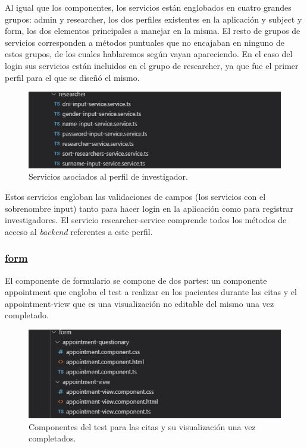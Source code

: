     Al igual que los componentes, los servicios están englobados en cuatro grandes grupos: admin y researcher, los dos perfiles existentes en la aplicación y subject y form, los dos elementos principales a manejar en la misma. El resto de grupos de servicios corresponden a métodos puntuales que no encajaban en ninguno de estos grupos, de los cuales hablaremos según vayan apareciendo. En el caso del login sus servicios están incluidos en el grupo de researcher, ya que fue el primer perfil para el que se diseñó el mismo.
    
     \begin{figure}[h]
    \centering
     \includegraphics[width=1\textwidth]{images/researcherService.jpg}
    \caption{Servicios asociados al perfil de investigador.}
    \end{figure}
    \FloatBarrier
    
    Estos servicios engloban las validaciones de campos (los servicios con el sobrenombre input) tanto para hacer login en la aplicación como para registrar investigadores. El servicio researcher-service comprende todos los métodos de acceso al \textit{backend} referentes a este perfil.
    
    \subsubsection{\underline{form}}
    
    El componente de formulario se compone de dos partes: un componente appointment que engloba el test a realizar en los pacientes durante las citas y el appointment-view que es una visualización no editable del mismo una vez completado.
    
    \begin{figure}[h]
    \centering
    \includegraphics[width=1\textwidth]{images/formComponent.jpg}
    \caption{Componentes del test para las citas y su visualización una vez completados.}
    \end{figure}
    \FloatBarrier
    
